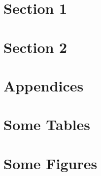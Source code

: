 \section{Section 1} \label{seclong:label3}

\lipsum[1-6]

\section{Section 2} \label{seclong:label2}

\lipsum[1-10]


\newpage
\thispagestyle{empty}
\section*{Appendices}

\begin{subappendices}
    \setcounter{table}{0}
    \renewcommand{\thetable}{A\arabic{table}}
    \setcounter{figure}{0}
    \renewcommand{\thefigure}{A\arabic{figure}}

    \section{Some Tables} \label{app:tables}
    


    \section{Some Figures} \label{app:figures}

    





\end{subappendices}